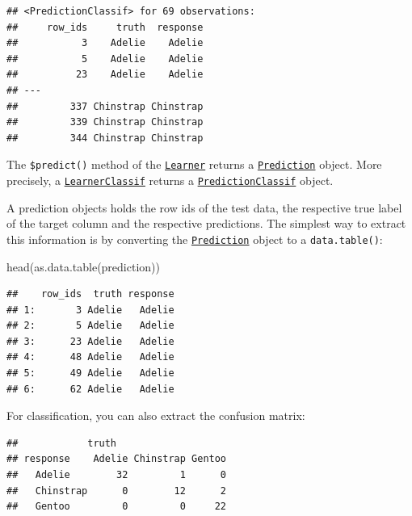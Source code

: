 \documentclass[
]{scrbook}
\newenvironment{Shaded}{\begin{snugshade}}{\end{snugshade}}
\newcommand{\FunctionTok}[1]{\textcolor[rgb]{0.00,0.00,0.00}{#1}}
\newcommand{\NormalTok}[1]{#1}
\newcommand{\SpecialCharTok}[1]{\textcolor[rgb]{0.00,0.00,0.00}{#1}}
\renewenvironment{Shaded} {\begin{snugshade}\small} {\end{snugshade}}
\begin{document}
\begin{verbatim}
## <PredictionClassif> for 69 observations:
##     row_ids     truth  response
##           3    Adelie    Adelie
##           5    Adelie    Adelie
##          23    Adelie    Adelie
## ---                            
##         337 Chinstrap Chinstrap
##         339 Chinstrap Chinstrap
##         344 Chinstrap Chinstrap
\end{verbatim}

The \texttt{\$predict()} method of the \href{https://mlr3.mlr-org.com/reference/Learner.html}{\texttt{Learner}} returns a \href{https://mlr3.mlr-org.com/reference/Prediction.html}{\texttt{Prediction}} object.
More precisely, a \href{https://mlr3.mlr-org.com/reference/LearnerClassif.html}{\texttt{LearnerClassif}} returns a \href{https://mlr3.mlr-org.com/reference/PredictionClassif.html}{\texttt{PredictionClassif}} object.

A prediction objects holds the row ids of the test data, the respective true label of the target column and the respective predictions.
The simplest way to extract this information is by converting the \href{https://mlr3.mlr-org.com/reference/Prediction.html}{\texttt{Prediction}} object to a \texttt{data.table()}:

\begin{Shaded}
\begin{Highlighting}[]
\FunctionTok{head}\NormalTok{(}\FunctionTok{as.data.table}\NormalTok{(prediction))}
\end{Highlighting}
\end{Shaded}

\begin{verbatim}
##    row_ids  truth response
## 1:       3 Adelie   Adelie
## 2:       5 Adelie   Adelie
## 3:      23 Adelie   Adelie
## 4:      48 Adelie   Adelie
## 5:      49 Adelie   Adelie
## 6:      62 Adelie   Adelie
\end{verbatim}

For classification, you can also extract the confusion matrix:

\begin{Shaded}
\end{Shaded}

\begin{verbatim}
##            truth
## response    Adelie Chinstrap Gentoo
##   Adelie        32         1      0
##   Chinstrap      0        12      2
##   Gentoo         0         0     22
\end{verbatim}
\end{document}
